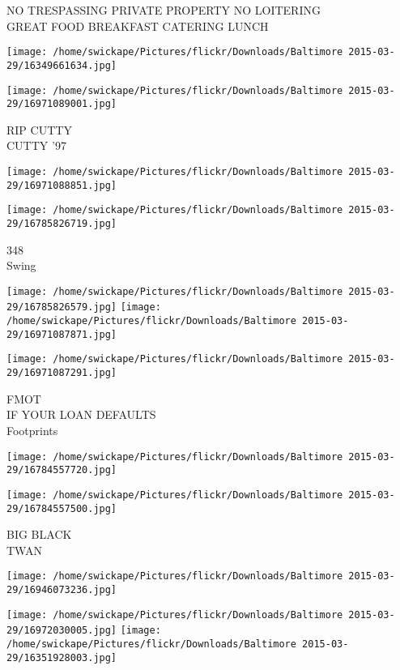 \documentclass[10pt,letterpaper]{article}
\begin{document}
NO TRESPASSING PRIVATE PROPERTY NO LOITERING\\
GREAT FOOD BREAKFAST CATERING LUNCH
\pagebreak

\texttt{[image: /home/swickape/Pictures/flickr/Downloads/Baltimore 2015-03-29/16349661634.jpg]}

\vspace{0.25in}
\texttt{[image: /home/swickape/Pictures/flickr/Downloads/Baltimore 2015-03-29/16971089001.jpg]}

RIP CUTTY\\
CUTTY '97
\pagebreak

\texttt{[image: /home/swickape/Pictures/flickr/Downloads/Baltimore 2015-03-29/16971088851.jpg]}

\vspace{0.25in}
\texttt{[image: /home/swickape/Pictures/flickr/Downloads/Baltimore 2015-03-29/16785826719.jpg]}

348\\
Swing
\pagebreak

\texttt{[image: /home/swickape/Pictures/flickr/Downloads/Baltimore 2015-03-29/16785826579.jpg]}
\texttt{[image: /home/swickape/Pictures/flickr/Downloads/Baltimore 2015-03-29/16971087871.jpg]}

\texttt{[image: /home/swickape/Pictures/flickr/Downloads/Baltimore 2015-03-29/16971087291.jpg]}

FMOT\\
IF YOUR LOAN DEFAULTS\\
Footprints
\pagebreak

\texttt{[image: /home/swickape/Pictures/flickr/Downloads/Baltimore 2015-03-29/16784557720.jpg]}

\vspace{0.25in}
\texttt{[image: /home/swickape/Pictures/flickr/Downloads/Baltimore 2015-03-29/16784557500.jpg]}

BIG BLACK\\
TWAN
\pagebreak

\texttt{[image: /home/swickape/Pictures/flickr/Downloads/Baltimore 2015-03-29/16946073236.jpg]}

\vspace{0.25in}
\texttt{[image: /home/swickape/Pictures/flickr/Downloads/Baltimore 2015-03-29/16972030005.jpg]}
\texttt{[image: /home/swickape/Pictures/flickr/Downloads/Baltimore 2015-03-29/16351928003.jpg]}
\end{document}
